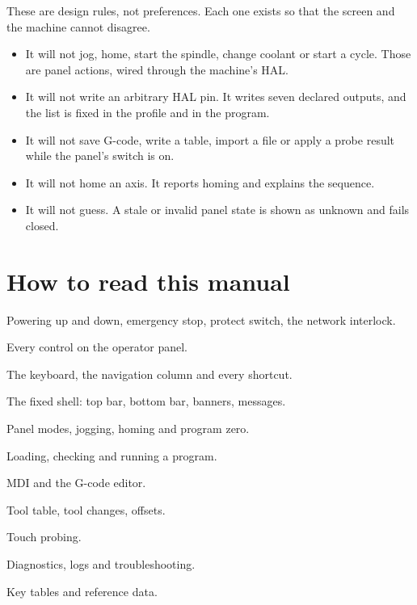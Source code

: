 These are design rules, not preferences. Each one exists so that the screen and the
machine cannot disagree.

\begin{itemize}
  \item It will not jog, home, start the spindle, change coolant or start a cycle.
        Those are panel actions, wired through the machine's HAL.
  \item It will not write an arbitrary HAL pin. It writes seven declared outputs, and
        the list is fixed in the profile and in the program.
  \item It will not save G-code, write a table, import a file or apply a probe result
        while the panel's  switch is on.
  \item It will not home an axis. It reports homing and explains the sequence.
  \item It will not guess. A stale or invalid panel state is shown as unknown and fails
        closed.
\end{itemize}

\section{How to read this manual}

\begin{description}[font=\normalfont\sffamily\bfseries, leftmargin=4.2cm, style=nextline]
  \item[Chapter \ref{ch:power}] Powering up and down, emergency stop, protect switch,
        the network interlock.
  \item[Chapter \ref{ch:panel}] Every control on the operator panel.
  \item[Chapter \ref{ch:keyboard}] The keyboard, the navigation column and every
        shortcut.
  \item[Chapter \ref{ch:screen}] The fixed shell: top bar, bottom bar, banners,
        messages.
  \item[Chapter \ref{ch:modes}] Panel modes, jogging, homing and program zero.
  \item[Chapter \ref{ch:running}] Loading, checking and running a program.
  \item[Chapter \ref{ch:mdi}] MDI and the G-code editor.
  \item[Chapter \ref{ch:tools}] Tool table, tool changes, offsets.
  \item[Chapter \ref{ch:probing}] Touch probing.
  \item[Chapter \ref{ch:diagnostics}] Diagnostics, logs and troubleshooting.
  \item[Chapter \ref{ch:quickref}] Key tables and reference data.
\end{description}

